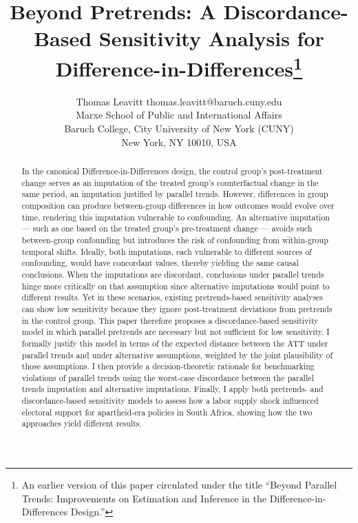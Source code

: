 \documentclass[twoside,11pt]{article}
\begin{document}
\title{Beyond Pretrends: A Discordance-Based Sensitivity Analysis for Difference-in-Differences\thanks{An earlier version of this paper circulated under the title ``Beyond Parallel Trends: Improvements on Estimation and Inference in the Difference-in-Differences Design.''}}

\author{\name Thomas Leavitt \email thomas.leavitt@baruch.cuny.edu \\
       \addr Marxe School of Public and International Affairs \\
       Baruch College, City University of New York (CUNY) \\
       New York, NY 10010, USA}

\maketitle

\begin{abstract}%
In the canonical Difference-in-Differences design, the control group's post-treatment change serves as an imputation of the treated group's counterfactual change in the same period, an imputation justified by parallel trends. However, differences in group composition can produce between-group differences in how outcomes would evolve over time, rendering this imputation vulnerable to confounding. An alternative imputation --- such as one based on the treated group's pre-treatment change --- avoids such between-group confounding but introduces the risk of confounding from within-group temporal shifts. Ideally, both imputations, each vulnerable to different sources of confounding, would have concordant values, thereby yielding the same causal conclusions. When the imputations are discordant, conclusions under parallel trends hinge more critically on that assumption since alternative imputations would point to different results. Yet in these scenarios, existing pretrends-based sensitivity analyses can show low sensitivity because they ignore post-treatment deviations from pretrends in the control group. This paper therefore proposes a discordance-based sensitivity model in which parallel pretrends are necessary but not sufficient for low sensitivity. I formally justify this model in terms of the expected distance between the \textrm{ATT} under parallel trends and under alternative assumptions, weighted by the joint plausibility of those assumptions. I then provide a decision-theoretic rationale for benchmarking violations of parallel trends using the worst-case discordance between the parallel trends imputation and alternative imputations. Finally, I apply both pretrends- and discordance-based sensitivity models to assess how a labor supply shock influenced electoral support for apartheid-era policies in South Africa, showing how the two approaches yield different results.
\end{abstract}
\end{document}
